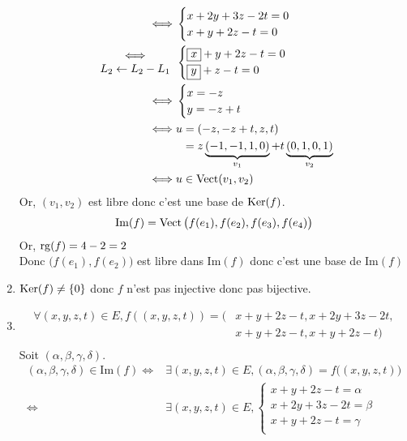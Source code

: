 \begin{enumerate}
\begin{align*}
			\iff& \begin{cases}
				x+2y+3z-2t=0\\
				x+y+2z-t=0\\
			\end{cases}\\
			\begin{array}{c}
				\iff\\
				L_2\leftarrow L_2 - L_1
			\end{array}&\begin{cases}
				\boxed x + y + 2z  -t = 0\\
				\boxed y + z - t = 0
			\end{cases}\\
			\iff& \begin{cases}
				x = -z\\
				y = -z + t
			\end{cases}\\
			\iff& u = (-z, -z + t, z, t)\\
			\phantom{\iff}& \phantom{u} = z\underbrace{(-1, -1, 1, 0)}_{v_1} + t\underbrace{(0,1,0,1)}_{v_2}\\
			\iff& u \in \operatorname{Vect}(v_1, v_2)
		\end{align*}
		Or, $(v_1, v_2)$ est libre donc c'est une base de $\operatorname{Ker}(f)$.\\
		\[
			\mathrm{Im}(f) = \operatorname{Vect}\big(f(e_1), f(e_2), f(e_3), f(e_4)\big)
		\] Or, $\operatorname{rg}(f) = 4 - 2 = 2$\\
		Donc $\big(f(e_1), f(e_2)\big)$ est libre dans $\mathrm{Im}(f)$ donc c'est une base de $\mathrm{Im}(f)$ 
	\item $\operatorname{Ker}(f) \neq \{0\}$ donc $f$ n'est pas injective donc pas bijective.
	\item
		\begin{align*}
			\forall (x,y,z,t) \in E, f((x,y,z,t)) = (&x + y + 2z - t, x + 2y + 3z -2t,\\
			&x + y + 2z - t, x + y + 2z - t) \\
		\end{align*}
		Soit $(\alpha, \beta, \gamma, \delta)$.
		\begin{align*}
			(\alpha, \beta, \gamma, \delta) \in \mathrm{Im}(f) \iff& \exists (x,y,z,t) \in E,
			(\alpha, \beta, \gamma, \delta) = f\big((x,y,z,t)\big)\\
			\iff& \exists (x,y,z,t) \in E, \begin{cases}
				x + y + 2z - t = \alpha\\
				x + 2y + 3z - 2t = \beta\\
				x + y + 2z - t = \gamma\\

\end{cases}
\end{align*}
\end{enumerate}
